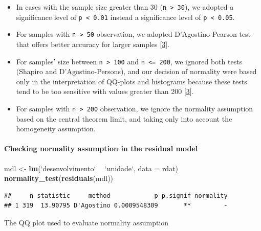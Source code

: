 \documentclass[]{article}
\newenvironment{Shaded}{\begin{snugshade}}{\end{snugshade}}
\newcommand{\DataTypeTok}[1]{\textcolor[rgb]{0.13,0.29,0.53}{#1}}
\newcommand{\KeywordTok}[1]{\textcolor[rgb]{0.13,0.29,0.53}{\textbf{#1}}}
\newcommand{\NormalTok}[1]{#1}
\newcommand{\OperatorTok}[1]{\textcolor[rgb]{0.81,0.36,0.00}{\textbf{#1}}}
\newcommand{\StringTok}[1]{\textcolor[rgb]{0.31,0.60,0.02}{#1}}
\let\oldparagraph\paragraph
\renewcommand{\paragraph}[1]{\oldparagraph{#1}\mbox{}}
\begin{document}
\begin{itemize}
\item
  In cases with the sample size greater than 30
  (\texttt{n\ \textgreater{}\ 30}), we adopted a significance level of
  \texttt{p\ \textless{}\ 0.01} instead a significance level of
  \texttt{p\ \textless{}\ 0.05}.
\item
  For samples with \texttt{n\ \textgreater{}\ 50} observation, we
  adopted D'Agostino-Pearson test that offers better accuracy for larger
  samples {[}\protect\hyperlink{references}{3}{]}.
\item
  For samples' size between \texttt{n\ \textgreater{}\ 100} and
  \texttt{n\ \textless{}=\ 200}, we ignored both tests (Shapiro and
  D'Agostino-Persons), and our decision of normality were based only in
  the interpretation of QQ-plots and histograms because these tests tend
  to be too sensitive with values greater than 200
  {[}\protect\hyperlink{references}{3}{]}.
\item
  For samples with \texttt{n\ \textgreater{}\ 200} observation, we
  ignore the normality assumption based on the central theorem limit,
  and taking only into account the homogeneity assumption.
\end{itemize}

\hypertarget{checking-normality-assumption-in-the-residual-model}{%
\paragraph{Checking normality assumption in the residual
model}\label{checking-normality-assumption-in-the-residual-model}}

\begin{Shaded}
\begin{Highlighting}[]
\NormalTok{mdl <-}\StringTok{ }\KeywordTok{lm}\NormalTok{(}\StringTok{`}\DataTypeTok{desenvolvimento}\StringTok{`} \OperatorTok{~}\StringTok{ `}\DataTypeTok{unidade}\StringTok{`}\NormalTok{, }\DataTypeTok{data =}\NormalTok{ rdat)}
\KeywordTok{normality_test}\NormalTok{(}\KeywordTok{residuals}\NormalTok{(mdl))}
\end{Highlighting}
\end{Shaded}

\begin{verbatim}
##     n statistic     method            p p.signif normality
## 1 319  13.90795 D'Agostino 0.0009548309       **         -
\end{verbatim}

The QQ plot used to evaluate normality assumption
\end{document}
